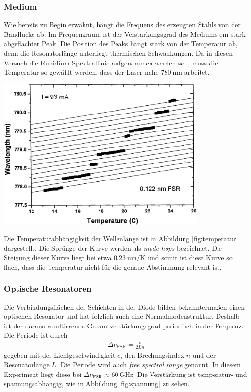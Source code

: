 \documentclass[captions=tableheading]{scrartcl}
\begin{document}
\subsubsection{Medium}
Wie bereits zu Begin erwähnt, hängt die Frequenz des erzeugten Stahls von der Bandlücke ab. 
Im Frequenzraum ist der Verstärkungsgrad des Mediums ein stark abgeflachter Peak. 
Die Position des Peaks hängt stark von der Temperatur ab, denn die Resonatorlänge unterliegt thermischen Schwankungen. 
Da in diesen Versuch die Rubidium Spektrallinie aufgenommen werden soll, muss die Temperatur so gewählt werden, dass der Laser nahe $\SI{780}{\nano\meter}$  arbeitet.
\begin{center}
	\includegraphics[width=10.5cm]{images/temperatur.png}
	\label{fig:temperatur}
\end{center}
Die Temperaturabhängigkeit der Wellenlänge ist in Abbildung \ref{fig:temperatur} dargestellt. 
Die Sprünge der Kurve werden als \textit{mode hops} bezeichnet. 
Die Steigung dieser Kurve liegt bei etwa $\SI{0.23}{\nano\meter\per\kelvin}$ und somit ist diese Kurve so flach, dass die Temperatur nicht für die genaue Abstimmung relevant ist. 

\subsubsection{Optische Resonatoren}
Die Verbindungsflächen der Schichten in der Diode bilden bekanntermaßen einen optischen Resonator und hat folglich auch eine Normalmodenstruktur.
Deshalb ist der daraus resultierende Gesamtverstärkungsgrad periodisch in der Frequenz. 
Die Periode ist durch
\begin{align*}
\Delta \nu_{\text{FSR}}=\frac{c}{2Ln}
\end{align*}
gegeben mit der Lichtgeschwindigkeit $c$, den Brechungsindex $n$ und der Resonatorlänge $L$. 
Die Periode wird auch \textit{free spectral range} genannt.
In diesem Experiment liegt diese bei $\Delta \nu_{\text{FSR}} \approx \SI{60}{\giga\hertz}$. 
Die Verstärkung ist temperatur- und spannungsabhängig, wie in Abbildung \ref{fig:spannung} zu sehen. 
\end{document}
